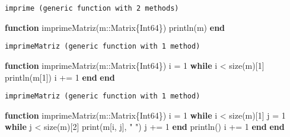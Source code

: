 \documentclass[
  letterpaper,
  DIV=11,
  numbers=noendperiod]{scrreprt}
\newenvironment{Shaded}{\begin{snugshade}}{\end{snugshade}}
\newcommand{\ControlFlowTok}[1]{\textcolor[rgb]{0.00,0.23,0.31}{\textbf{#1}}}
\newcommand{\DataTypeTok}[1]{\textcolor[rgb]{0.68,0.00,0.00}{#1}}
\newcommand{\FloatTok}[1]{\textcolor[rgb]{0.68,0.00,0.00}{#1}}
\newcommand{\FunctionTok}[1]{\textcolor[rgb]{0.28,0.35,0.67}{#1}}
\newcommand{\KeywordTok}[1]{\textcolor[rgb]{0.00,0.23,0.31}{\textbf{#1}}}
\newcommand{\NormalTok}[1]{\textcolor[rgb]{0.00,0.23,0.31}{#1}}
\newcommand{\OperatorTok}[1]{\textcolor[rgb]{0.37,0.37,0.37}{#1}}
\newcommand{\StringTok}[1]{\textcolor[rgb]{0.13,0.47,0.30}{#1}}
\begin{document}
\begin{verbatim}
imprime (generic function with 2 methods)
\end{verbatim}

\begin{Shaded}
\begin{Highlighting}[]
\KeywordTok{function} \FunctionTok{imprimeMatriz}\NormalTok{(m}\OperatorTok{::}\DataTypeTok{Matrix\{Int64\}}\NormalTok{)}
    \FunctionTok{println}\NormalTok{(m)}
\KeywordTok{end}
\end{Highlighting}
\end{Shaded}

\begin{verbatim}
imprimeMatriz (generic function with 1 method)
\end{verbatim}

\begin{Shaded}
\begin{Highlighting}[]
\KeywordTok{function} \FunctionTok{imprimeMatriz}\NormalTok{(m}\OperatorTok{::}\DataTypeTok{Matrix\{Int64\}}\NormalTok{)}
\NormalTok{    i }\OperatorTok{=} \FloatTok{1}
    \ControlFlowTok{while}\NormalTok{ i }\OperatorTok{\textless{}} \FunctionTok{size}\NormalTok{(m)[}\FloatTok{1}\NormalTok{]}
        \FunctionTok{println}\NormalTok{(m[}\FloatTok{1}\NormalTok{])}
\NormalTok{        i }\OperatorTok{+=} \FloatTok{1}
    \ControlFlowTok{end}
\KeywordTok{end}
\end{Highlighting}
\end{Shaded}

\begin{verbatim}
imprimeMatriz (generic function with 1 method)
\end{verbatim}

\begin{Shaded}
\begin{Highlighting}[]
\KeywordTok{function} \FunctionTok{imprimeMatriz}\NormalTok{(m}\OperatorTok{::}\DataTypeTok{Matrix\{Int64\}}\NormalTok{)}
\NormalTok{    i }\OperatorTok{=} \FloatTok{1}
    \ControlFlowTok{while}\NormalTok{ i }\OperatorTok{\textless{}} \FunctionTok{size}\NormalTok{(m)[}\FloatTok{1}\NormalTok{]}
\NormalTok{        j }\OperatorTok{=} \FloatTok{1}
        \ControlFlowTok{while}\NormalTok{ j }\OperatorTok{\textless{}} \FunctionTok{size}\NormalTok{(m)[}\FloatTok{2}\NormalTok{]}
            \FunctionTok{print}\NormalTok{(m[i, j], }\StringTok{" "}\NormalTok{)}
\NormalTok{            j }\OperatorTok{+=} \FloatTok{1}
        \ControlFlowTok{end}
        \FunctionTok{println}\NormalTok{()   }
\NormalTok{        i }\OperatorTok{+=} \FloatTok{1}
    \ControlFlowTok{end}
\KeywordTok{end}
\end{Highlighting}
\end{Shaded}
\end{document}
